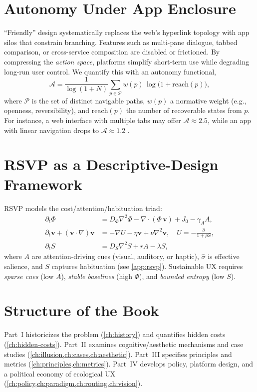 \documentclass[openany]{book}
\newcommand{\PhiS}{\Phi} %
\newcommand{\vvec}{\mathbf{v}} %
\newcommand{\Sent}{S} %
\newcommand{\Auton}{\mathcal{A}} %
\begin{document}
\section{Autonomy Under App Enclosure}
\label{sec:intro-autonomy}
\enquote{Friendly} design systematically replaces the web's hyperlink topology with app silos that constrain branching. Features such as multi-pane dialogue, tabbed comparison, or cross-service composition are disabled or frictioned. By compressing the \emph{action space}, platforms simplify short-term use while degrading long-run user control. We quantify this with an autonomy functional,
\begin{equation}
\label{eq:autonomy}
\Auton = \frac{1}{\log(1+N)}\sum_{p\in \mathcal{P}} w(p)\,\log\big(1+\mathrm{reach}(p)\big),
\end{equation}
where $\mathcal{P}$ is the set of distinct navigable paths, $w(p)$ a normative weight (e.g., openness, reversibility), and $\mathrm{reach}(p)$ the number of recoverable states from $p$. For instance, a web interface with multiple tabs may offer $\Auton \approx 2.5$, while an app with linear navigation drops to $\Auton \approx 1.2$ \citep{doctorow2022}.

\section{RSVP as a Descriptive-Design Framework}
\label{sec:intro-rsvp}
RSVP models the cost/attention/habituation triad:
\begin{align}
\partial_t \PhiS &= D_\Phi \nabla^2 \PhiS - \nabla\!\cdot(\PhiS\,\vvec) + J_0 - \gamma_A A, \label{eq:intro-phi}\\[2pt]
\partial_t \vvec + (\vvec\!\cdot\!\nabla)\vvec &= -\nabla U - \eta \vvec + \nu\nabla^2\vvec, \quad U=-\frac{\widehat{\sigma}}{1+\rho \Sent}, \label{eq:intro-v}\\[2pt]
\partial_t \Sent &= D_S \nabla^2 \Sent + r A - \lambda \Sent, \label{eq:intro-S}
\end{align}
where $A$ are attention-driving cues (visual, auditory, or haptic), $\widehat{\sigma}$ is effective salience, and $\Sent$ captures habituation (see \cref{app:rsvp}). Sustainable UX requires \emph{sparse cues} (low $A$), \emph{stable baselines} (high $\PhiS$), and \emph{bounded entropy} (low $\Sent$).

\section{Structure of the Book}
\label{sec:intro-structure}
Part~I historicizes the problem (\cref{ch:history}) and quantifies hidden costs (\cref{ch:hidden-costs}). Part~II examines cognitive/aesthetic mechanisms and case studies (\cref{ch:illusion,ch:cases,ch:aesthetic}). Part~III specifies principles and metrics (\cref{ch:principles,ch:metrics}). Part~IV develops policy, platform design, and a political economy of ecological UX (\cref{ch:policy,ch:paradigm,ch:routing,ch:vision}).
\end{document}
